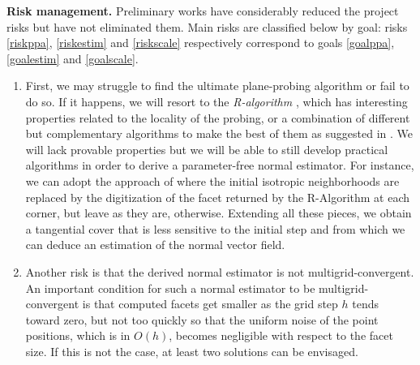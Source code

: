 \noindent\textbf{Risk management.}
Preliminary works have considerably reduced the project risks but have not eliminated them.
Main risks are classified below by goal: risks \ref{riskppa}, \ref{riskestim} and \ref{riskscale}
respectively correspond to goals \ref{goalppa}, \ref{goalestim} and \ref{goalscale}. 
\begin{enumerate}[label=(R\arabic*)]
  \item %
First, we may struggle to find the ultimate plane-probing algorithm or fail to do so.
If it happens, we will resort to the \emph{R-algorithm} \cite{LPRJMIV2017}, which
has interesting properties related to the locality of the probing, or a combination
of different but complementary algorithms to make the best of them as suggested in
\cite{LPRJMIV2017}. We will lack provable properties but we will be able to still
develop practical algorithms in order to derive a parameter-free normal estimator.
For instance, we can adopt the approach of \citeauthor*{Charrier2011} \cite{Charrier2011}
where the initial isotropic neighborhoods are replaced by the digitization of the facet
returned by the R-Algorithm at each corner, but leave as they are, otherwise. Extending all
these pieces, we obtain a tangential cover that is less sensitive to the initial step and
from which we can deduce an estimation of the normal vector field. \label{riskppa} 
\item %
Another risk is that the derived normal estimator is not multigrid-convergent.
An important condition for such a normal estimator to be multigrid-convergent
is that computed facets get smaller as the grid step $h$ tends toward zero,
but not too quickly so that the uniform noise of the point positions,
which is in $O(h)$, becomes negligible with respect to the facet size. 
If this is not the case, at least two solutions can be envisaged. 

\end{enumerate}
